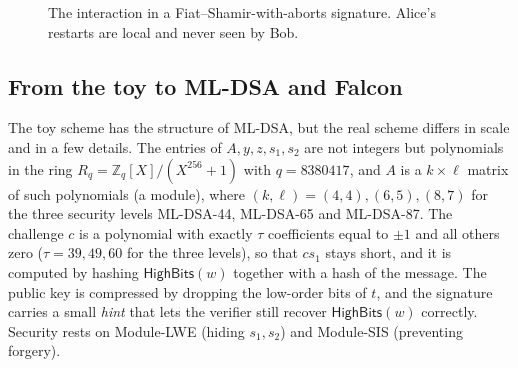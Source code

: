\documentclass[11pt,a4paper]{article}
\theoremstyle{definition}
\newcommand{\Z}{\mathbb{Z}}
\newcommand{\Hash}{H}
\newcommand{\HB}{\mathsf{HighBits}}
\begin{document}
\begin{figure}[h]
\centering
{}
\caption{The interaction in a Fiat--Shamir-with-aborts signature. Alice's restarts are local and never seen by Bob.}
\end{figure}

\subsection{From the toy to ML-DSA and Falcon}

The toy scheme has the structure of ML-DSA, but the real scheme differs in scale and in a few details. The entries of $A,y,z,s_1,s_2$ are not integers but polynomials in the ring $R_q=\Z_q[X]/(X^{256}+1)$ with $q=8380417$, and $A$ is a $k\times\ell$ matrix of such polynomials (a module), where $(k,\ell)=(4,4),(6,5),(8,7)$ for the three security levels ML-DSA-44, ML-DSA-65 and ML-DSA-87. The challenge $c$ is a polynomial with exactly $\tau$ coefficients equal to $\pm1$ and all others zero ($\tau=39,49,60$ for the three levels), so that $cs_1$ stays short, and it is computed by hashing $\HB(w)$ together with a hash of the message. The public key is compressed by dropping the low-order bits of $t$, and the signature carries a small \emph{hint} that lets the verifier still recover $\HB(w)$ correctly. Security rests on Module-LWE (hiding $s_1,s_2$) and Module-SIS (preventing forgery).
\end{document}

